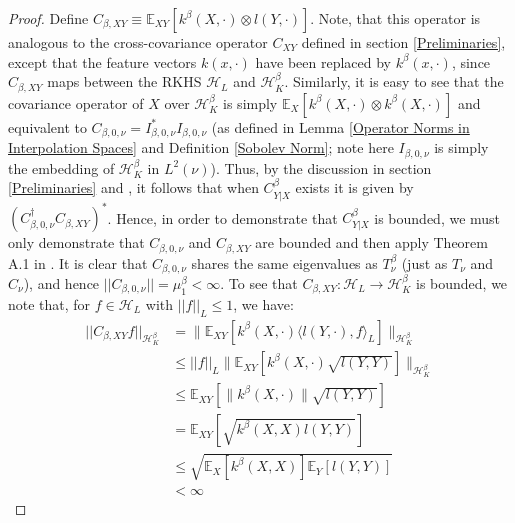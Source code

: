 \documentclass[accepted]{article}
\theoremstyle{definition}
\begin{document}
\begin{proof}
Define $C_{\beta, XY} \equiv \mathbb{E}_{XY}[k^{\beta}(X, \cdot) \otimes l(Y, \cdot)]$. Note, that this operator is analogous to the cross-covariance operator $C_{XY}$ defined in section \ref{Preliminaries}, except that the feature vectors $k(x, \cdot)$ have been replaced by $k^{\beta}(x, \cdot)$, since $C_{\beta, XY}$ maps between the RKHS $\mathcal{H}_L$ and $\mathcal{H}^{\beta}_K$. Similarly, it is easy to see that the covariance operator of $X$ over $\mathcal{H}^{\beta}_{K}$ is simply $\mathbb{E}_{X}[k^{\beta}(X, \cdot) \otimes k^{\beta}(X, \cdot)]$ and equivalent to $C_{\beta, 0, \nu} = I^{*}_{\beta, 0, \nu}I_{\beta, 0, \nu}$ (as defined in Lemma \ref{Operator Norms in Interpolation Spaces} and Definition \ref{Sobolev Norm}; note here $I_{\beta, 0, \nu}$ is simply the embedding of $\mathcal{H}^{\beta}_K$ in $L^2(\nu)$). Thus, by the discussion in section \ref{Preliminaries} and \cite{klebanov2020rigorous}, it follows that when $C^{\beta}_{Y|X}$ exists it is given by $(C_{\beta, 0, \nu}^{\dagger}C_{\beta, XY})^{*}$. Hence, in order to demonstrate that $C^{\beta}_{Y|X}$ is bounded, we must only demonstrate that $C_{\beta, 0, \nu}$ and $C_{\beta, XY}$ are bounded and then apply Theorem A.1 in \cite{klebanov2020rigorous}. It is clear that $C_{\beta, 0, \nu}$ shares the same eigenvalues as $T^{\beta}_{\nu}$ (just as $T_{\nu}$ and $C_{\nu}$), and hence $||C_{\beta, 0, \nu}|| = \mu^{\beta}_1 < \infty$. To see that $C_{\beta, XY}: \mathcal{H}_L \to \mathcal{H}^{\beta}_K$ is bounded, we note that, for $f \in \mathcal{H}_L$ with $||f||_{L} \leq 1$, we have:
\begin{align}
    ||C_{\beta, XY} f||_{\mathcal{H}^{\beta}_K} & = \Big\|\mathbb{E}_{XY}[k^{\beta}(X, \cdot) \langle l(Y, \cdot), f \rangle_{L}]\Big\|_{\mathcal{H}^{\beta}_K} \nonumber \\
    & \leq ||f||_{L}\Big\|\mathbb{E}_{XY}[k^{\beta}(X, \cdot)\sqrt{l(Y, Y)}]\Big\|_{\mathcal{H}^{\beta}_K} \label{eq: CS1} \\
    & \leq \mathbb{E}_{XY}[\|k^{\beta}(X, \cdot)\|\sqrt{l(Y, Y)}] \label{eq: Jensen's} \\
    & = \mathbb{E}_{XY}[\sqrt{k^{\beta}(X, X)l(Y, Y)}] \nonumber \\
    & \leq \sqrt{\mathbb{E}_X[k^{\beta}(X, X)]\mathbb{E}_Y[l(Y, Y)]} \label{eq: CS2} \\
    & < \infty \label{eq: Finiteness}
\end{align}

\end{proof}
\end{document}
